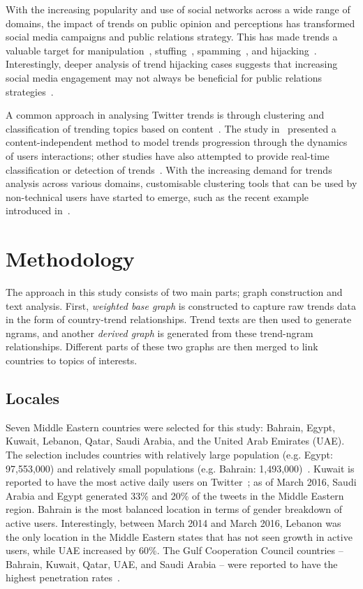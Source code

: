\documentclass[conference]{IEEEtran}
\begin{document}
With the increasing popularity and use of social networks across a
wide range of domains, the impact of trends on public opinion and
perceptions has transformed social media campaigns and public
relations strategy. This has made trends a valuable target for
manipulation~\cite{Zhang2017}, stuffing~\cite{Irani2010},
spamming~\cite{Sedhai2015,Chu2012}, and
hijacking~\cite{VanDam2016}. Interestingly, deeper analysis of trend
hijacking cases suggests that increasing social media engagement may
not always be beneficial for public relations
strategies~\cite{Sanderson2016}.

A common approach in analysing Twitter trends is through clustering
and classification of trending topics based on
content~\cite{Zubiaga2011,Benhardus2013,Ferragina2015,albishry-et-al:iccci2017}.
The study in~\cite{TenThij2016} presented a content-independent method
to model trends progression through the dynamics of users
interactions; other studies have also attempted to provide real-time
classification or detection of
trends~\cite{Mathioudakis2010,Zubiaga2015}. With the increasing demand
for trends analysis across various domains, customisable clustering
tools that can be used by non-technical users have started to emerge,
such as the recent example introduced in~\cite{Arn2018}.

\section{Methodology}\label{method}

The approach in this study consists of two main parts; graph construction
and text analysis. First, {\emph{weighted base graph}} is constructed to 
capture raw trends data in the form of country-trend relationships. Trend 
texts are then used to generate ngrams, and another {\emph{derived graph}}
is generated from these trend-ngram relationships. Different parts of these 
two graphs are then merged to link countries to topics of interests.

\subsection{Locales}

Seven Middle Eastern countries were selected for this study: Bahrain,
Egypt, Kuwait, Lebanon, Qatar, Saudi Arabia, and the United Arab
Emirates (UAE). The selection includes countries with relatively large
population (e.g. Egypt: 97,553,000) and relatively small populations
(e.g. Bahrain:
1,493,000)~\cite{UnitedNationsDepartmentofEconomicandSocialAffairs2017}.
Kuwait is reported to have the most active daily users on
Twitter~\cite{Salem2017}; as of March 2016, Saudi Arabia and Egypt
generated 33\% and 20\% of the tweets in the Middle Eastern
region. Bahrain is the most balanced location in terms of gender
breakdown of active users. Interestingly, between March 2014 and March
2016, Lebanon was the only location in the Middle Eastern states that
has not seen growth in active users, while UAE increased by 60\%. The
Gulf Cooperation Council countries -- Bahrain, Kuwait, Qatar, UAE, and
Saudi Arabia -- were reported to have the highest penetration
rates~\cite{Salem2017}.
\end{document}
